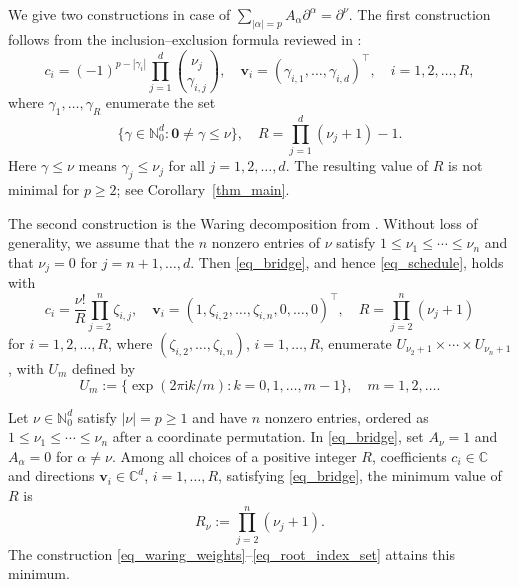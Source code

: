 \documentclass[final,oneeqnum]{siamltex}
\newcommand{\C}{\mathbb{C}}
\newcommand{\N}{\mathbb{N}}
\newcommand{\bv}{\bm{v}}
\newcommand{\abs}[1]{\left|#1\right|}
\begin{document}
We give two constructions in case of $\sum_{\abs{\alpha} = p} A_{\alpha} \partial^\alpha = \partial^\nu$.
The first construction follows from the inclusion--exclusion formula reviewed in \cite[Sec.~6.1, Eq.~(25)]{Shi2026stdepp}:
\begin{equation*}
    c_i = (-1)^{p - \abs{\gamma_i}} \prod_{j = 1}^{d} \binom{\nu_j}{\gamma_{i, j}}, \quad \bv_i = (\gamma_{i, 1}, \ldots, \gamma_{i, d})^\top, \quad i = 1, 2, \ldots, R,
\end{equation*}
where $\gamma_1, \ldots, \gamma_R$ enumerate the set
\begin{equation*}
    \bigl\{\gamma \in \N_0^d : \boldsymbol{0} \ne \gamma \leq \nu\bigr\}, \quad R = \prod_{j = 1}^{d} (\nu_j + 1) - 1.
\end{equation*}
Here $\gamma \leq \nu$ means $\gamma_j \leq \nu_j$ for all $j = 1, 2, \ldots, d$.
The resulting value of $R$ is not minimal for $p \geq 2$; see Corollary~\ref{thm_main}.

The second construction is the Waring decomposition from \cite[Sec.~2, Eq.~(8)]{BBT2013}.
Without loss of generality, we assume that the $n$ nonzero entries of $\nu$ satisfy $1 \leq \nu_1 \leq \cdots \leq \nu_n$ and that $\nu_j = 0$ for $j = n + 1, \ldots, d$.
Then \eqref{eq_bridge}, and hence \eqref{eq_schedule}, holds with
\begin{equation}\label{eq_waring_weights}
    c_i = \frac{\nu!}{R} \prod_{j = 2}^{n} \zeta_{i, j}, \quad \bv_i = (1, \zeta_{i, 2}, \ldots, \zeta_{i, n}, 0, \ldots, 0)^\top, \quad R = \prod_{j = 2}^{n} (\nu_j + 1)
\end{equation}
for $i = 1, 2, \ldots, R$, where $(\zeta_{i, 2}, \ldots, \zeta_{i, n})$, $i = 1, \ldots, R$, enumerate $U_{\nu_2 + 1} \times \cdots \times U_{\nu_n + 1}$, with $U_m$ defined by
\begin{equation}\label{eq_root_index_set}
    U_m := \bigl\{\exp(2 \pi \mathrm{i} k / m) : k = 0, 1, \ldots, m - 1\bigr\}, \quad m = 1, 2, \ldots.
\end{equation}

\begin{corollary}\label{thm_main}
    Let $\nu \in \N_0^d$ satisfy $\abs{\nu} = p \geq 1$ and have $n$ nonzero entries, ordered as $1 \leq \nu_1 \leq \cdots \leq \nu_n$ after a coordinate permutation.
    In \eqref{eq_bridge}, set $A_{\nu} = 1$ and $A_{\alpha} = 0$ for $\alpha \ne \nu$.
    Among all choices of a positive integer $R$, coefficients $c_i \in \C$ and directions $\bv_i \in \C^d$, $i = 1, \ldots, R$, satisfying \eqref{eq_bridge}, the minimum value of $R$ is
    \begin{equation}\label{eq_directional_rank}
        R_\nu := \prod_{j = 2}^{n} (\nu_j + 1).
    \end{equation}
    The construction \eqref{eq_waring_weights}--\eqref{eq_root_index_set} attains this minimum.
\end{corollary}
\end{document}
